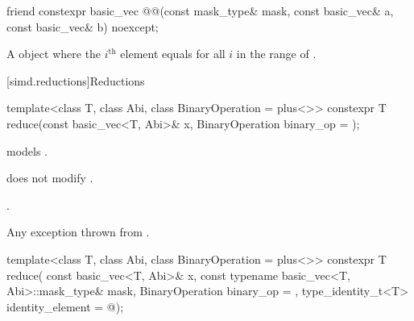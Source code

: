 \begin{itemdecl}
friend constexpr basic_vec
@@(const mask_type& mask, const basic_vec& a, const basic_vec& b) noexcept;
\end{itemdecl}

\begin{itemdescr}
\pnum
\returns
A  object where the $i^\text{th}$ element equals
 for all $i$ in the range of
.
\end{itemdescr}

[simd.reductions]{Reductions}

\begin{itemdecl}
template<class T, class Abi, class BinaryOperation = plus<>>
  constexpr T reduce(const basic_vec<T, Abi>& x, BinaryOperation binary_op = {});
\end{itemdecl}

\begin{itemdescr}
\pnum
\constraints
{} models
.

\pnum
\expects
{} does not modify .

\pnum
\returns
{}.

\pnum
\throws
Any exception thrown from .
\end{itemdescr}

\begin{itemdecl}
template<class T, class Abi, class BinaryOperation = plus<>>
  constexpr T reduce(
    const basic_vec<T, Abi>& x, const typename basic_vec<T, Abi>::mask_type& mask,
    BinaryOperation binary_op = {}, type_identity_t<T> identity_element = @\seebelow@);
\end{itemdecl}

